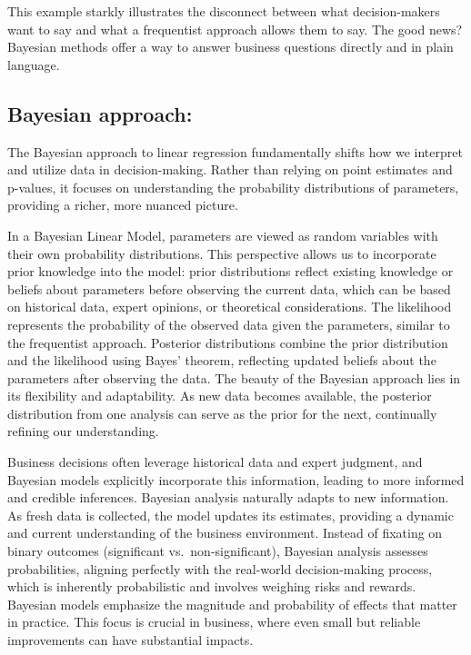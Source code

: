 \documentclass[
  letterpaper,
  DIV=11,
  numbers=noendperiod]{scrreprt}
\begin{document}
This example starkly illustrates the disconnect between what
decision-makers want to say and what a frequentist approach allows them
to say. The good news? Bayesian methods offer a way to answer business
questions directly and in plain language.

\subsection{Bayesian approach:}\label{bayesian-approach}

The Bayesian approach to linear regression fundamentally shifts how we
interpret and utilize data in decision-making. Rather than relying on
point estimates and p-values, it focuses on understanding the
probability distributions of parameters, providing a richer, more
nuanced picture.

In a Bayesian Linear Model, parameters are viewed as random variables
with their own probability distributions. This perspective allows us to
incorporate prior knowledge into the model: prior distributions reflect
existing knowledge or beliefs about parameters before observing the
current data, which can be based on historical data, expert opinions, or
theoretical considerations. The likelihood represents the probability of
the observed data given the parameters, similar to the frequentist
approach. Posterior distributions combine the prior distribution and the
likelihood using Bayes' theorem, reflecting updated beliefs about the
parameters after observing the data. The beauty of the Bayesian approach
lies in its flexibility and adaptability. As new data becomes available,
the posterior distribution from one analysis can serve as the prior for
the next, continually refining our understanding.

Business decisions often leverage historical data and expert judgment,
and Bayesian models explicitly incorporate this information, leading to
more informed and credible inferences. Bayesian analysis naturally
adapts to new information. As fresh data is collected, the model updates
its estimates, providing a dynamic and current understanding of the
business environment. Instead of fixating on binary outcomes
(significant vs.~non-significant), Bayesian analysis assesses
probabilities, aligning perfectly with the real-world decision-making
process, which is inherently probabilistic and involves weighing risks
and rewards. Bayesian models emphasize the magnitude and probability of
effects that matter in practice. This focus is crucial in business,
where even small but reliable improvements can have substantial impacts.
\end{document}
